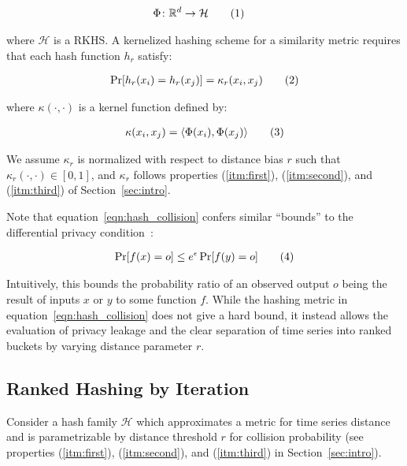 \documentclass[a4paper]{article}
\newcommand\numberthis{\addtocounter{equation}{1}\tag{\theequation}}
\newcommand{\innerproduct}[2]{\langle{}#1,#2\rangle{}}
\begin{document}
\begin{align*}
    \Phi \colon \mathbb{R}^d &\to \mathcal{H} \numberthis
\end{align*}

where $\mathcal{H}$ is a RKHS\@.
A kernelized hashing scheme for a similarity metric requires that each hash function $h_r$ satisfy:

\begin{align*}
    \Pr[h_r(x_i) = h_r(x_j)] = \kappa_r(x_i, x_j) \numberthis
    \label{eqn:hash_collision}
\end{align*}

where $\kappa(\cdot,\cdot)$ is a kernel function defined by:

\begin{align*}
    \kappa(x_i,x_j) = \innerproduct{\Phi(x_i)}{\Phi(x_j)} \numberthis
\end{align*}

We assume $\kappa_r$ is normalized with respect to distance bias $r$ such that $\kappa_r(\cdot,\cdot) \in [0,1]$, and $\kappa_r$ follows properties (\ref{itm:first}), (\ref{itm:second}), and (\ref{itm:third}) of Section~\ref{sec:intro}.

Note that equation~\ref{eqn:hash_collision} confers similar ``bounds'' to the differential privacy condition~\cite{dwork2006}:

\begin{align*}
    \Pr[f(x) = o] \le e^{\epsilon} \Pr[f(y) = o] \numberthis
    \label{eqn:differential_privacy}
\end{align*}

Intuitively, this bounds the probability ratio of an observed output $o$ being the result of inputs $x$ or $y$ to some function $f$.
While the hashing metric in equation~\ref{eqn:hash_collision} does not give a hard bound, it instead allows the evaluation of privacy leakage and the clear separation of time series into ranked buckets by varying distance parameter $r$.

\subsection{Ranked Hashing by Iteration}
\label{subsec:ranked_lsh}

Consider a hash family $\mathcal{H}$ which approximates a metric for time series distance and is parametrizable by distance threshold $r$ for collision probability (see properties (\ref{itm:first}), (\ref{itm:second}), and (\ref{itm:third}) in Section~\ref{sec:intro}).
\end{document}
